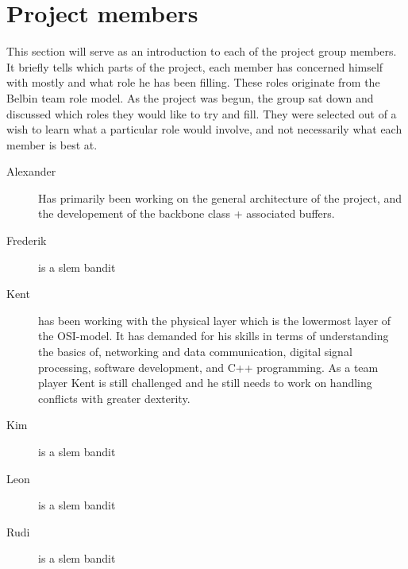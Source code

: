 \section{Project members}
This section will serve as an introduction to each of the project group members. It briefly tells which parts of the project, each member has concerned himself with mostly and what role he has been filling. These roles originate from the Belbin team role model. As the project was begun, the group sat down and discussed which roles they would like to try and fill. They were selected out of a wish to learn what a particular role would involve, and not necessarily what each member is best at.

\begin{description}
\item[Alexander] Has primarily been working on the general architecture of the project, and the developement of the backbone class + associated buffers.
\item[Frederik] is a slem bandit
\item[Kent]
has been working with the physical layer which is the lowermost layer of the OSI-model. It has demanded for his skills in terms of understanding the basics of, networking and data communication, digital signal processing, software development, and C++ programming. As a team player Kent is still challenged and he still needs to work on handling conflicts with greater dexterity.
\item[Kim] is a slem bandit
\item[Leon] is a slem bandit
\item[Rudi] is a slem bandit
\end{description}